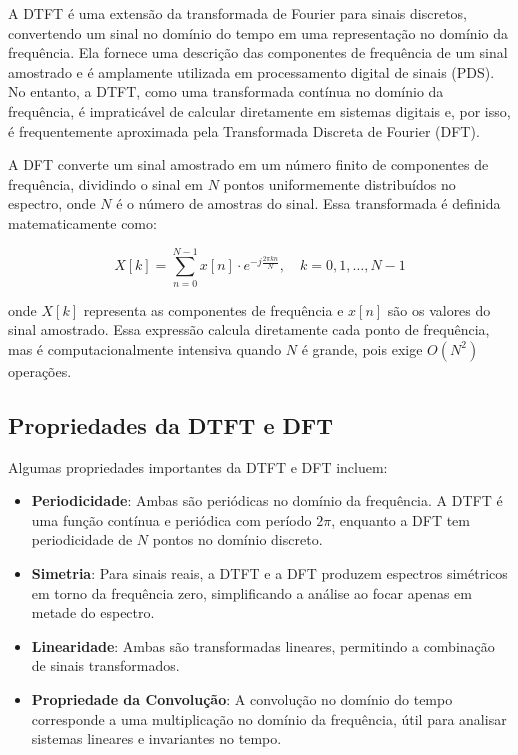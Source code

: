 
A DTFT é uma extensão da transformada de Fourier para sinais discretos, convertendo um sinal no domínio do tempo em uma representação no domínio da frequência. Ela fornece uma descrição das componentes de frequência de um sinal amostrado e é amplamente utilizada em processamento digital de sinais (PDS). No entanto, a DTFT, como uma transformada contínua no domínio da frequência, é impraticável de calcular diretamente em sistemas digitais e, por isso, é frequentemente aproximada pela Transformada Discreta de Fourier (DFT).

A DFT converte um sinal amostrado em um número finito de componentes de frequência, dividindo o sinal em \( N \) pontos uniformemente distribuídos no espectro, onde \( N \) é o número de amostras do sinal. Essa transformada é definida matematicamente como:

\[
X[k] = \sum_{n=0}^{N-1} x[n] \cdot e^{-j \frac{2 \pi k n}{N}}, \quad k = 0, 1, \dots, N-1
\]

onde \( X[k] \) representa as componentes de frequência e \( x[n] \) são os valores do sinal amostrado. Essa expressão calcula diretamente cada ponto de frequência, mas é computacionalmente intensiva quando \( N \) é grande, pois exige \( O(N^2) \) operações.

\subsection{Propriedades da DTFT e DFT}

Algumas propriedades importantes da DTFT e DFT incluem:

\begin{itemize}
    \item \textbf{Periodicidade}: Ambas são periódicas no domínio da frequência. A DTFT é uma função contínua e periódica com período \( 2\pi \), enquanto a DFT tem periodicidade de \( N \) pontos no domínio discreto.
    \item \textbf{Simetria}: Para sinais reais, a DTFT e a DFT produzem espectros simétricos em torno da frequência zero, simplificando a análise ao focar apenas em metade do espectro.
    \item \textbf{Linearidade}: Ambas são transformadas lineares, permitindo a combinação de sinais transformados.
    \item \textbf{Propriedade da Convolução}: A convolução no domínio do tempo corresponde a uma multiplicação no domínio da frequência, útil para analisar sistemas lineares e invariantes no tempo.
\end{itemize}

